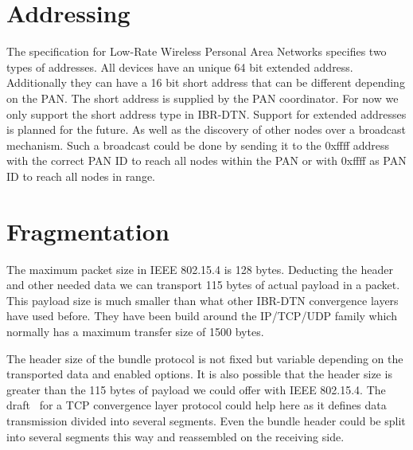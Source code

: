 \section{Addressing}

The specification for Low-Rate Wireless Personal Area Networks specifies two
types of addresses. All devices have an unique 64 bit extended address.
Additionally they can have a 16 bit short address that can be different depending
on the PAN. The short address is supplied by the PAN coordinator. For now we
only support the short address type in IBR-DTN. Support for extended addresses
is planned for the future. As well as the discovery of other nodes over a
broadcast mechanism. Such a broadcast could be done by sending it to the 0xffff
address with the correct PAN ID to reach all nodes within the PAN or with 0xffff
as PAN ID to reach all nodes in range.

\section{Fragmentation}

The maximum packet size in IEEE 802.15.4 is 128 bytes. Deducting the header
and other needed data we can transport 115 bytes of actual payload in a
packet. This payload size is much smaller than what other IBR-DTN convergence
layers have used before. They have been build around the IP/TCP/UDP family which
normally has a maximum transfer size of 1500 bytes.

The header size of the bundle protocol is not fixed but variable depending on
the transported data and enabled options. It is also possible that the header
size is greater than the 115 bytes of payload we could offer with IEEE 802.15.4. The
draft~\cite{tcp-clayer-draft} for a TCP convergence layer protocol could help here as it
defines data transmission divided into several segments. Even the bundle
header could be split into several segments this way and reassembled on the
receiving side.

